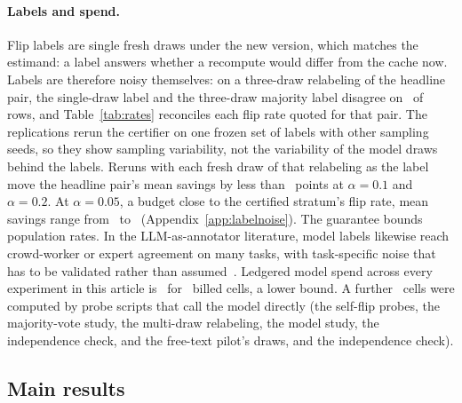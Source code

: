 \paragraph{Labels and spend.} Flip labels are single fresh draws
under the new version, which matches the estimand: a label answers
whether a recompute would differ from the cache now. Labels are therefore
noisy themselves: on a three-draw relabeling of the headline pair, the
single-draw label and the three-draw majority label disagree on
\ of rows, and Table~\ref{tab:rates} reconciles each flip
rate quoted for that pair.
The replications rerun the certifier on one frozen set of labels with
other sampling seeds, so they show sampling variability, not the
variability of the model draws behind the labels. Reruns with each fresh
draw of that relabeling as the label move the headline pair's mean savings
by less than \ points at $\alpha{=}0.1$ and
$\alpha{=}0.2$. At $\alpha{=}0.05$, a budget close to the certified
stratum's flip rate, mean savings range from \ to
\ (Appendix~\ref{app:labelnoise}). The
guarantee bounds population rates. In the LLM-as-annotator literature,
model labels likewise reach crowd-worker or expert agreement on many
tasks, with task-specific noise that has to be validated rather than
assumed~\cite{gilardi,ziems,pangakis,tornberg}. Ledgered model spend
across every experiment in this article is \totalSpend\ for
\totalCells\ billed cells, a lower bound. A further \offLedgerCells\ cells were
computed by probe scripts that call the model directly (the self-flip
probes, the majority-vote study, the multi-draw relabeling,
the model study\ifnum{}\relax, the independence
check, and the free-text pilot's draws\else, and the independence
check\fi).

\keepheading
\subsection{Main results}
\label{sec:exp-main}

